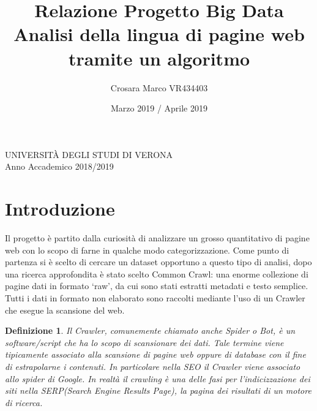 \documentclass{article}
\title{Relazione Progetto Big Data\\Analisi della lingua di pagine web\\tramite un algoritmo \MR}
\author{Crosara Marco VR434403}
\date{Marzo 2019 / Aprile 2019}
\newcommand{\CC}{Common Crawl}
\newtheorem*{definition}{Definizione}
\begin{document}
\maketitle
\thispagestyle{empty}

\vspace{\fill}

\begin{center}
  UNIVERSITÀ DEGLI STUDI DI VERONA\\
Anno Accademico 2018/2019
\end{center}

\newpage

\tableofcontents
\thispagestyle{empty}

\newpage



\section{Introduzione}

Il progetto è partito dalla curiosità di analizzare un grosso quantitativo di pagine web con lo scopo di farne in qualche modo categorizzazione. Come punto di partenza si è scelto di cercare un dataset opportuno a questo tipo di analisi, dopo una ricerca approfondita è stato scelto \CC{}\cite{commoncrawl}: una enorme collezione di pagine dati in formato `raw', da cui sono stati estratti metadati e testo semplice. Tutti i dati in formato non elaborato sono raccolti mediante l'uso di un Crawler che esegue la scansione del web.

\begin{definition}
Il Crawler, comunemente chiamato anche Spider o Bot, è un software/script che ha lo scopo di scansionare dei dati. Tale termine viene tipicamente associato alla scansione di pagine web oppure di database con il fine di estrapolarne i contenuti. In particolare nella SEO il Crawler viene associato allo spider di Google. In realtà il crawling è una delle fasi per l’indicizzazione dei siti nella SERP(Search Engine Results Page), la pagina dei risultati di un motore di ricerca.
\end{definition}
\end{document}
